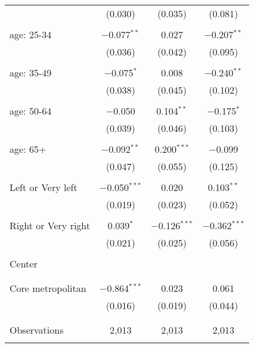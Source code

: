 \begin{tabular}{@{\extracolsep{5pt}}lccc}
  & (0.030) & (0.035) & (0.081) \\ 
  & & & \\ 
 age: 25-34 & $-$0.077$^{**}$ & 0.027 & $-$0.207$^{**}$ \\ 
  & (0.036) & (0.042) & (0.095) \\ 
  & & & \\ 
 age: 35-49 & $-$0.075$^{*}$ & 0.008 & $-$0.240$^{**}$ \\ 
  & (0.038) & (0.045) & (0.102) \\ 
  & & & \\ 
 age: 50-64 & $-$0.050 & 0.104$^{**}$ & $-$0.175$^{*}$ \\ 
  & (0.039) & (0.046) & (0.103) \\ 
  & & & \\ 
 age: 65+ & $-$0.092$^{**}$ & 0.200$^{***}$ & $-$0.099 \\ 
  & (0.047) & (0.055) & (0.125) \\ 
  & & & \\ 
 Left or Very left & $-$0.050$^{***}$ & 0.020 & 0.103$^{**}$ \\ 
  & (0.019) & (0.023) & (0.052) \\ 
  & & & \\ 
 Right or Very right & 0.039$^{*}$ & $-$0.126$^{***}$ & $-$0.362$^{***}$ \\ 
  & (0.021) & (0.025) & (0.056) \\ 
  & & & \\ 
 Center &  &  &  \\ 
  &  &  &  \\ 
  & & & \\ 
 Core metropolitan & $-$0.864$^{***}$ & 0.023 & 0.061 \\ 
  & (0.016) & (0.019) & (0.044) \\ 
  & & & \\ 
\hline \\[-1.8ex] 

Observations & 2,013 & 2,013 & 2,013 \\ 
\hline 
\hline \\[-1.8ex] 
\end{tabular} 